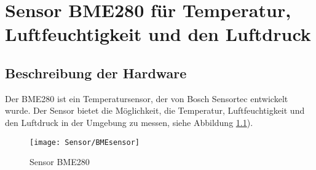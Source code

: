 %
%
%



	
\chapter{Sensor BME280 für Temperatur, Luftfeuchtigkeit und den Luftdruck}

\section{Beschreibung der Hardware}

Der BME280 ist ein Temperatursensor, der von Bosch Sensortec entwickelt wurde. Der Sensor bietet die Möglichkeit, die Temperatur, Luftfeuchtigkeit und den Luftdruck in der Umgebung zu messen, siehe Abbildung \ref{fig:SensorBME280}). \cite{FunduinoBME280:2023}

\begin{figure}[h]
    \texttt{[image: Sensor/BMEsensor]}
    \caption{Sensor BME280}   \cite{LastMinuteEngineers:2023}
    \centering   \label{fig:SensorBME280}
\end{figure}

